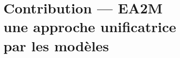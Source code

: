 \documentclass[a4paper,11pt,twoside]{book}
\begin{document}
    \part[Contribution — EA2M : une approche unificatrice par les modèles]{Contribution — EA2M \\ une approche unificatrice \\par les modèles}
    
    
    
    
    
    \appendix
    
    \printglossaries
    
    
\end{document}
